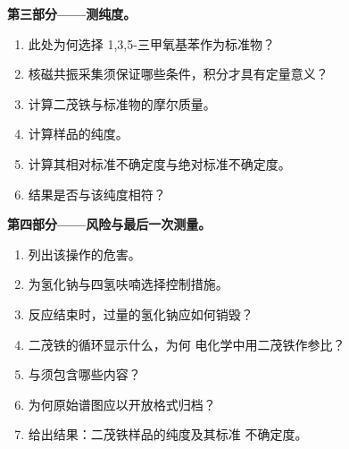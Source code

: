 \begin{problem}
\medskip\noindent\textbf{第三部分——测纯度。}
\begin{enumerate}[resume]
  \item 此处为何选择 1,3,5-三甲氧基苯作为标准物？
  \item 核磁共振采集须保证哪些条件，积分才具有定量意义？
  \item 计算二茂铁与标准物的摩尔质量。
  \item 计算样品的纯度。
  \item 计算其相对标准不确定度与绝对标准不确定度。
  \item {}结果是否与该纯度相符？
\end{enumerate}

\medskip\noindent\textbf{第四部分——风险与最后一次测量。}
\begin{enumerate}[resume]
  \item 列出该操作的危害。
  \item 为氢化钠与四氢呋喃选择控制措施。
  \item 反应结束时，过量的氢化钠应如何销毁？
  \item 二茂铁的循环显示什么，为何
        电化学中用二茂铁作参比？
  \item {}与须包含哪些内容？
  \item 为何原始谱图应以开放格式归档？
  \item 给出结果：二茂铁样品的纯度及其标准
        不确定度。
\end{enumerate}
\end{problem}

